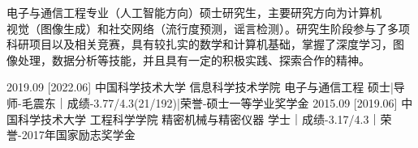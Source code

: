 \documentclass[zh]{resume}
\begin{document}
\makeheader

{\onehalfspacing\hspace{2em}%
电子与通信工程专业（人工智能方向）硕士研究生，主要研究方向为计算机\\视觉（图像生成）和社交网络（流行度预测，谣言检测）。研究生阶段参与了多项\\科研项目以及相关竞赛，具有较扎实的数学和计算机基础，掌握了深度学习，图\\像处理，数据分析等技能，并且具有一定的积极实践、探索合作的精神。
\par}

\begin{educations}

  \education%
    {2019.09}%
    [2022.06]%
    {中国科学技术大学}%
    {信息科学技术学院}%
    {电子与通信工程}%
    {硕士|导师-毛震东｜成绩-3.77/4.3(21/192)|荣誉-硕士一等学业奖学金}
  \separator{0.5ex}
  \education%
    {2015.09}%
    [2019.06]%
    {中国科学技术大学}%
    {工程科学学院}%
    {精密机械与精密仪器}%
    {学士｜成绩-3.17/4.3｜荣誉-2017年国家励志奖学金}
\end{educations}

\end{document}
